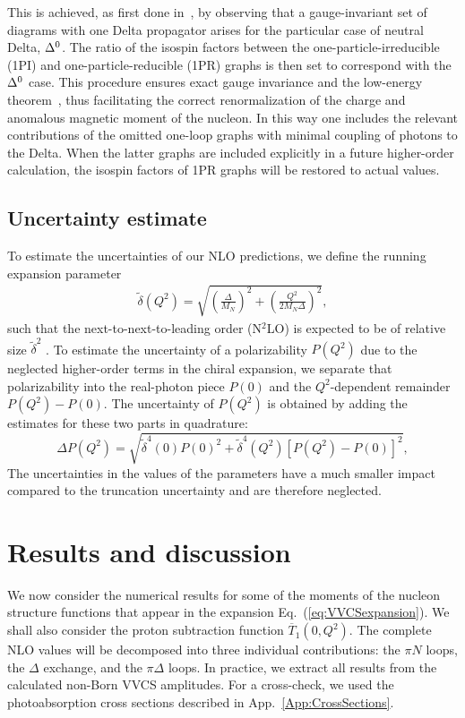 \documentclass[12pt,preprint,tightenlines,
showpacs,preprintnumbers,amsmath,amssymb,
a4paper,nofootinbib]{revtex4-2}
\def\beq{\begin{equation}}
\def\eeq{\end{equation}}
\def\eqlab#1{\label{eq:#1}}
\def\Eqref#1{Eq.~(\ref{eq:#1})}
\def\ol#1{\overline{#1}}
\begin{document}
This is achieved, as first done in~\cite{Lensky:2009uv}, by observing that a gauge-invariant set of 
diagrams with one Delta propagator arises for the particular case of neutral Delta, 
$\Delta^0$. The ratio of the isospin factors between the one-particle-irreducible (1PI) and 
one-particle-reducible (1PR) graphs is then set to correspond with the $\Delta^0$ case.
This procedure ensures exact gauge invariance and the low-energy theorem~\cite{Low:1954kd, GellMann:1954kc}, thus facilitating the correct renormalization of the charge and anomalous magnetic moment of the nucleon.
In this way one
includes the relevant contributions of the omitted one-loop graphs with minimal coupling of photons to the Delta. When  the latter graphs 
are included explicitly in a future higher-order calculation, the isospin factors of 1PR graphs will be restored to actual values.



\subsection{Uncertainty estimate}

To estimate the uncertainties of our NLO predictions, we define the running expansion parameter
\begin{align}
 \tilde{\delta}(Q^2) = \sqrt{ \left(\frac{\varDelta}{M_N}\right)^2 + \left(\frac{Q^2}{2 M_N \varDelta}\right)^2 },\eqlab{dtilde}
\end{align}
such that the next-to-next-to-leading order (N$^2$LO) is expected to be of relative size $\tilde{\delta}^2$ \cite{Pascalutsa:2005vq}.
To estimate the uncertainty of a polarizability $P(Q^2)$ due to the neglected higher-order terms in the
chiral expansion, we separate that polarizability into the real-photon piece
$P(0)$ and the $Q^2$-dependent remainder $P(Q^2)-P(0)$. The uncertainty of $P(Q^2)$ is obtained by adding the
estimates for these two parts in quadrature:
\beq
\Delta P(Q^2)= \sqrt{\tilde \delta^4(0) P(0)^2 +\tilde \delta^4(Q^2) \left[P(Q^2)-P(0)\right]^2},
\eeq
The uncertainties in the values of the parameters have a much smaller impact compared to the truncation
uncertainty and are therefore neglected.


\section{Results and discussion}

We now consider the numerical results for some of 
the moments of the nucleon structure functions that appear in the expansion \Eqref{VVCSexpansion}. We shall also consider the proton subtraction function $\ol{T}_1(0,Q^2)$. The complete NLO values will be decomposed into three
individual contributions: the $\pi N$ loops, the $\Delta$ exchange, and the $\pi \Delta$ loops. In practice, we extract all results from the calculated non-Born VVCS amplitudes. For a cross-check, we used the photoabsorption cross sections  described in App.~\ref{App:CrossSections}.
\end{document}
